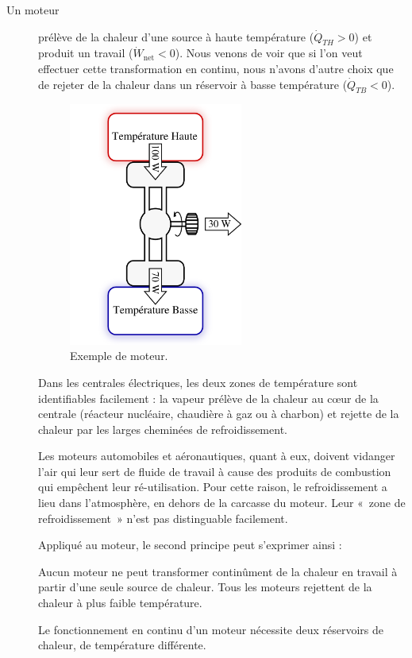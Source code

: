 	\begin{description}

		\item[Un moteur]{prélève de la chaleur d’une source à haute température ($\dot{Q}_{TH} > 0$) et produit un travail ($\dot{W}_\text{net} < 0$). Nous venons de voir que si l’on veut effectuer cette transformation en continu, nous n’avons d’autre choix que de rejeter de la chaleur dans un réservoir à basse température ($\dot{Q}_{TB} < 0$).

		\begin{figure}
			\begin{center}
				\includegraphics[height=8cm]{images/exemple_moteur.png}
			\end{center}
			\caption{Exemple de moteur.}
		\end{figure}

		Dans les centrales électriques, les deux zones de température sont identifiables facilement : la vapeur prélève de la chaleur au cœur de la centrale (réacteur nucléaire, chaudière à gaz ou à charbon) et rejette de la chaleur par les larges cheminées de refroidissement.

		Les moteurs automobiles et aéronautiques, quant à eux, doivent vidanger l’air qui leur sert de fluide de travail à cause des produits de combustion qui empêchent leur ré-utilisation. Pour cette raison, le refroidissement a lieu dans l’atmosphère, en dehors de la carcasse du moteur. Leur «~zone de refroidissement~» n’est pas distinguable facilement.

		Appliqué au moteur, le second principe peut s’exprimer ainsi :

		\begin{trucimportant}
		Aucun moteur ne peut transformer continûment\linebreak
		de la chaleur en travail\linebreak
		à partir d’une seule source de chaleur.\linebreak
		Tous les moteurs rejettent de la chaleur à plus faible température.\linebreak
		\end{trucimportant}
		\begin{trucimportant}
		Le fonctionnement en continu d’un moteur\linebreak
		nécessite deux réservoirs de chaleur, de température différente.
		\end{trucimportant}

}
\end{description}
